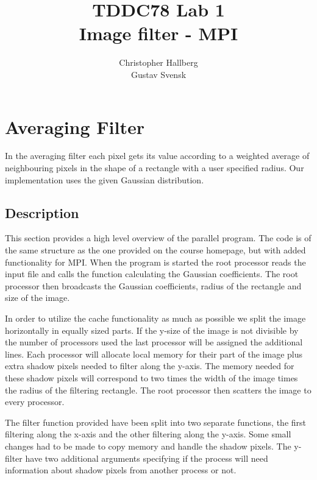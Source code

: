 \documentclass[a4paper, 12pt]{article}
\begin{document}
\title{TDDC78 Lab 1\\
        Image filter - MPI}
\author{Christopher Hallberg \\
        Gustav Svensk}
\maketitle

\thispagestyle{empty}

\newpage
\setcounter{page}{1}
\tableofcontents
\newpage

\section{Averaging Filter}
In the averaging filter each pixel gets its value according to a weighted average
of neighbouring pixels in the shape of a rectangle with a user specified radius. 
Our implementation uses the given Gaussian distribution.

\subsection{Description}
\label{sec:desc}
This section provides a high level overview of the parallel program. 
The code is of the same structure as the one provided on the course homepage,
but with added functionality for MPI. When the
program is started the root processor reads the input file and calls
the function calculating the Gaussian coefficients. The root processor then
broadcasts the Gaussian coefficients, radius of the rectangle and size of the image.


In order to utilize the cache functionality as much as possible we split the image
horizontally in equally sized parts. If the y-size of the image is not divisible
by the number of processors used the last processor will be assigned the
additional lines. Each processor will allocate local memory for their part of the
image plus extra shadow pixels needed to filter along the y-axis. The memory
needed for these shadow pixels will correspond to two times the width of the
image times the radius of the filtering rectangle. The root processor then 
scatters the image to every processor.  

The filter function provided have been split into two separate functions, the
first filtering along the x-axis and the other filtering along the y-axis. Some
small changes had to be made to copy memory and handle the shadow pixels. The
y-filter have two additional arguments specifying if the process will need
information about shadow pixels from another process or not. 
\end{document}
